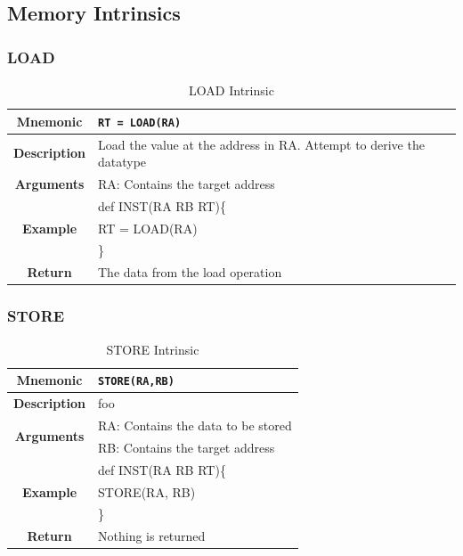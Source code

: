 \documentclass{article}
\begin{document}
\clearpage
\subsection{Memory Intrinsics}
\label{sec:MemIntrinsics}

\subsubsection{LOAD}
\label{sec:LOAD}

\begin{table}[h]
\begin{center}
\caption{LOAD Intrinsic}
\vspace{0.125in}
\label{tab:LOADIntrinsic}
\begin{tabular}{|c|l|}
\hline
\textbf{Mnemonic} & \texttt{RT = LOAD(RA)}\\
\hline
\textbf{Description} & Load the value at the address in RA.  Attempt to derive the datatype\\
\hline
\textbf{Arguments} & RA: Contains the target address \\
\hline
\multirow{3}{*}{\textbf{Example}} & def INST(RA RB RT)\{\\
                          			  &   RT = LOAD(RA)\\
                                                    & \}\\
\hline
\textbf{Return} & The data from the load operation\\                                                    
\hline
\end{tabular}
\end{center}
\end{table}

\clearpage
\subsubsection{STORE}
\label{sec:STORE}

\begin{table}[h]
\begin{center}
\caption{STORE Intrinsic}
\vspace{0.125in}
\label{tab:STOREIntrinsic}
\begin{tabular}{|c|l|}
\hline
\textbf{Mnemonic} & \texttt{STORE(RA,RB)}\\
\hline
\textbf{Description} & foo\\
\hline
\multirow{2}{*}{\textbf{Arguments}} & RA: Contains the data to be stored\\
                          			     & RB: Contains the target address \\
\hline
\multirow{3}{*}{\textbf{Example}} & def INST(RA RB RT)\{\\
                          			  &   STORE(RA, RB)\\
                                                    & \}\\
\hline
\textbf{Return} & Nothing is returned\\                                                    
\hline
\end{tabular}
\end{center}
\end{table}
\end{document}

